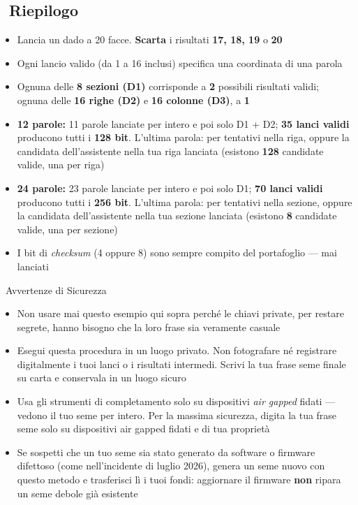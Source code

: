 \documentclass[10pt]{article}
\begin{document}
\subsection*{\faListOl~Riepilogo}

\begin{itemize}[itemsep=1pt]
 \item Lancia un dado a 20 facce. \textbf{Scarta} i risultati \textbf{17, 18, 19} o \textbf{20}
 \item Ogni lancio valido (da 1 a 16 inclusi) specifica una coordinata di una parola
 \item Ognuna delle \textbf{8 sezioni (D1)} corrisponde a \textbf{2} possibili risultati validi; ognuna delle \textbf{16 righe (D2)} e \textbf{16 colonne (D3)}, a \textbf{1}
 \item \textbf{12 parole:} 11 parole lanciate per intero e poi solo D1 + D2; \textbf{35 lanci validi} producono tutti i \textbf{128 bit}. L'ultima parola: per tentativi nella riga, oppure la candidata dell'assistente nella tua riga lanciata (esistono \textbf{128} candidate valide, una per riga)
 \item \textbf{24 parole:} 23 parole lanciate per intero e poi solo D1; \textbf{70 lanci validi} producono tutti i \textbf{256 bit}. L'ultima parola: per tentativi nella sezione, oppure la candidata dell'assistente nella tua sezione lanciata (esistono \textbf{8} candidate valide, una per sezione)
 \item I bit di \textit{checksum} (4 oppure 8) sono sempre compito del portafoglio --- mai lanciati
\end{itemize}

\begin{warnbox}{\faExclamationTriangle~Avvertenze di Sicurezza}
\begin{itemize}[itemsep=1pt]
 \item Non usare mai questo esempio qui sopra perché le chiavi private, per restare segrete, hanno bisogno che la loro frase sia veramente casuale
 \item Esegui questa procedura in un luogo privato. Non fotografare né registrare digitalmente i tuoi lanci o i risultati intermedi. Scrivi la tua frase seme finale su carta e conservala in un luogo sicuro
 \item Usa gli strumenti di completamento solo su dispositivi \textit{air gapped} fidati --- vedono il tuo seme per intero. Per la massima sicurezza, digita la tua frase seme solo su dispositivi air gapped fidati e di tua proprietà
 \item Se sospetti che un tuo seme sia stato generato da software o firmware difettoso (come nell'incidente di luglio 2026), genera un seme nuovo con questo metodo e trasferisci lì i tuoi fondi: aggiornare il firmware \textbf{non} ripara un seme debole già esistente
\end{itemize}
\end{warnbox}
\end{document}
